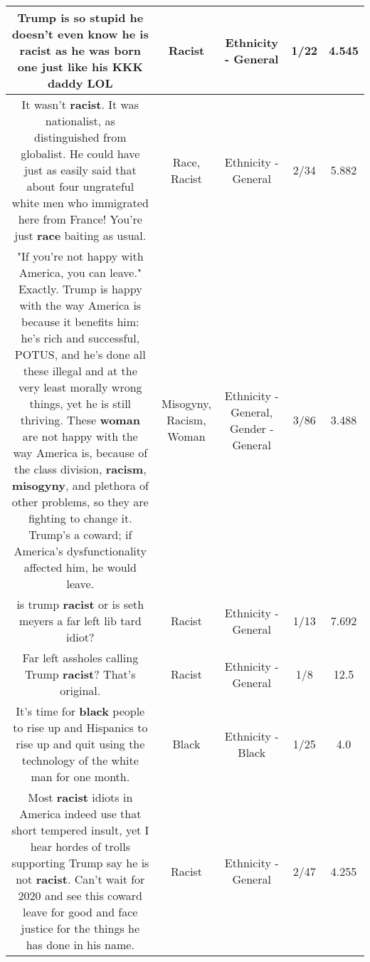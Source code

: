 \documentclass[11pt]{article}
\newlength\mylength
\begin{document}
\begin{center}
\begin{longtable}{|C{.65\mylength}|C{.30\mylength}|C{.12\mylength}|C{.12\mylength}|C{.12\mylength}|}
  \small Trump is so stupid he doesn't even know he is \textbf{racist} as he was born one just like his KKK daddy LOL\normalsize   & Racist & Ethnicity - General & 1/22 & 4.545 \\  \hline
  \small It wasn't \textbf{racist}. It was nationalist, as distinguished from globalist. He could have just as easily said that about four ungrateful white men who immigrated here from France! You're just \textbf{race} baiting as usual.\normalsize   & Race, Racist & Ethnicity - General & 2/34 & 5.882 \\  \hline
  \small "If you're not happy with America, you can leave." Exactly. Trump is happy with the way America is because it benefits him: he's rich and successful, POTUS, and he's done all these illegal and at the very least morally wrong things, yet he is still thriving. These \textbf{woman} are not happy with the way America is, because of the class division, \textbf{racism}, \textbf{misogyny}, and plethora of other problems, so they are fighting to change it. Trump's a coward; if America's dysfunctionality affected him, he would leave.\normalsize   & Misogyny, Racism, Woman & Ethnicity - General, Gender - General & 3/86 & 3.488 \\  \hline
  \small is trump \textbf{racist} or is seth meyers a far left lib tard idiot?\normalsize   & Racist & Ethnicity - General & 1/13 & 7.692 \\  \hline
  \small Far left assholes calling Trump \textbf{racist}? That's original.\normalsize   & Racist & Ethnicity - General & 1/8 & 12.5 \\  \hline
  \small It's time for \textbf{black} people to rise up and Hispanics to rise up and quit using the technology of the white man for one month.\normalsize   & Black & Ethnicity - Black & 1/25 & 4.0 \\  \hline
  \small Most \textbf{racist} idiots in America indeed use that short tempered insult, yet I hear hordes of trolls supporting Trump say he is not \textbf{racist}. Can't wait for 2020 and see this coward leave for good and face justice for the things he has done in his name.\normalsize   & Racist & Ethnicity - General & 2/47 & 4.255 \\  \hline

\end{longtable}
\end{center}
\end{document}
